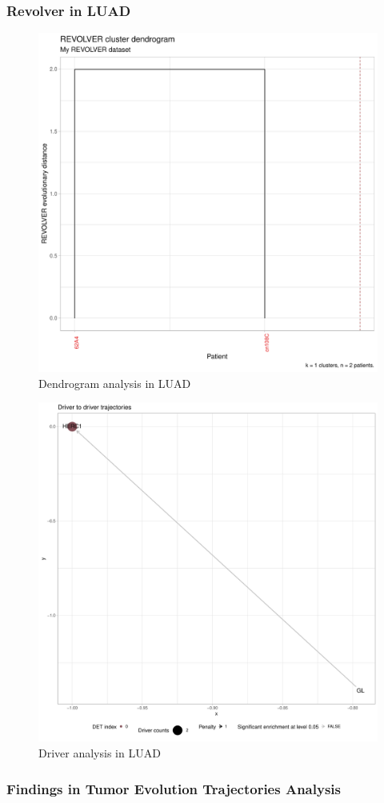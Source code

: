 \documentclass{beamer}
\begin{document}
    \begin{frame}[allowframebreaks]
        \frametitle{Revolver in LUAD}

        \begin{figure}
            \includegraphics[width=0.5 \linewidth]{figures/Revolver/BWA/ADC.dendrogram.pdf}
            \caption{Dendrogram analysis in LUAD}
        \end{figure}

        \begin{figure}
            \includegraphics[width=0.5 \linewidth]{figures/Revolver/BWA/ADC.driver.pdf}
            \caption{Driver analysis in LUAD}
        \end{figure}
    \end{frame}

    \begin{frame}
        \frametitle{Findings in Tumor Evolution Trajectories Analysis}
    \end{frame}
\end{document}
